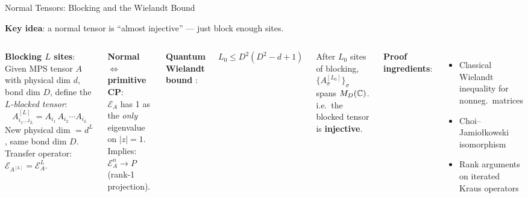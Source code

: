 \documentclass[aspectratio=169,10pt]{beamer}
\begin{document}
\begin{frame}{Normal Tensors: Blocking and the Wielandt Bound}
    \vspace{-0.5em}

    \textbf{Key idea}: a normal tensor is ``almost injective'' ---
    just block enough sites.

    \vspace{0.3em}
    \begin{columns}[T]
        \textbf{Blocking $L$ sites}:\\[3pt]
        {\small Given MPS tensor $A$ with physical dim $d$, bond dim $D$,
        define the \emph{$L$-blocked tensor}:}
        \[
            A^{[L]}_{i_1\ldots i_L} = A_{i_1}\, A_{i_2}\cdots A_{i_L}
        \]
        {\small New physical dim $= d^L$, same bond dim $D$.
        Transfer operator: $\mathcal{E}_{A^{[L]}} = \mathcal{E}_A^L$.}

        \vspace{0.4em}
        \textbf{Normal $\Leftrightarrow$ primitive CP}:\\[2pt]
        {\small $\mathcal{E}_A$ has 1 as the \emph{only} eigenvalue on $|z|=1$.\\
        Implies: $\mathcal{E}_A^n \to P$ (rank-1 projection).}

        \textbf{\textcolor{amber}{Quantum Wielandt bound}} \cite{Sanz2010Quantum}:
        \vspace{0.2em}

        \colorbox{cardbg}{\parbox{0.92\columnwidth}{\centering\small
        $L_0 \leq D^2(D^2 - d + 1)$
        }}

        \vspace{0.3em}
        {\small After $L_0$ sites of blocking, $\{A^{[L_0]}_\sigma\}_\sigma$
        spans $M_D(\mathbb{C})$.\\[3pt]
        i.e.\ the blocked tensor is \textbf{injective}.}

        \vspace{0.4em}
        \textbf{Proof ingredients}:
        \begin{itemize}\itemsep0.08em\footnotesize
            \item Classical Wielandt inequality for nonneg.\ matrices
            \item Choi--Jamio{\l}kowski isomorphism
            \item Rank arguments on iterated Kraus operators
        \end{itemize}


\end{columns}
\end{frame}
\end{document}
